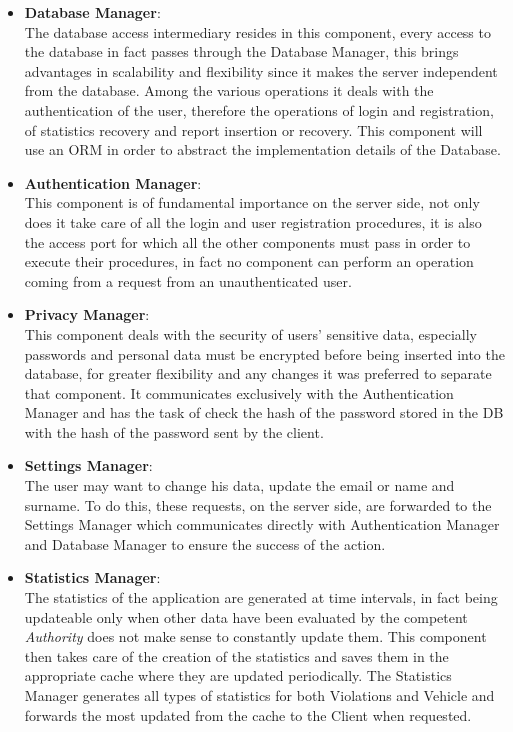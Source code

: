 \documentclass{article}
\begin{document}
\begin{itemize}

\item \textbf{Database Manager}: \\
The database access intermediary resides in this component, every access to the database in 
fact passes through the Database Manager, this brings advantages in scalability and flexibility 
since it makes the server independent from the database. Among the various operations it deals 
with the authentication of the user, therefore the operations of login and registration, 
of statistics recovery and report insertion or recovery. This component will use an 
ORM in order to abstract the implementation details of the Database.

\item \textbf{Authentication Manager}: \\
This component is of fundamental importance on the server side, not only does it take care 
of all the login and user registration procedures, it is also the access port for which all 
the other components must pass in order to execute their procedures, in fact no component 
can perform an operation coming from a request from an unauthenticated user.

\item \textbf{Privacy Manager}: \\
This component deals with the security of users' sensitive data, especially passwords 
and personal data must be encrypted before being inserted into the database, for greater 
flexibility and any changes it was preferred to separate that component. 
It communicates exclusively with the Authentication Manager and has the task 
of check the hash of the password stored in the DB with the hash of the 
password sent by the client.

\item \textbf{Settings Manager}: \\
The user may want to change his data, update the email or name and surname. To do this, these 
requests, on the server side, are forwarded to the Settings Manager which communicates directly 
with Authentication Manager and Database Manager to ensure the success of the action. 

\item \textbf{Statistics Manager}: \\
The statistics of the application are generated at time intervals, in fact being 
updateable only when other data have been evaluated by the competent \textit{Authority} does 
not make sense to constantly update them. This component then takes care of the creation 
of the statistics and saves them in the appropriate cache where they are updated periodically. 
The Statistics Manager generates all types of statistics for both Violations and Vehicle and 
forwards the most updated from the cache to the Client when requested.


\end{itemize}
\end{document}

